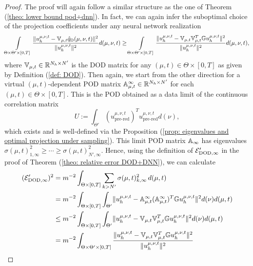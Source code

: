 \begin{proof}  
    The proof will again follow a similar structure as the one of Theorem (\ref{theo: lower bound pod+dnn}).
    In fact, we can again infer the suboptimal choice of the projection coefficients under any neural network
    realization
    \begin{equation*}
        \int\limits_{\Theta \times \Theta' \times [0, T]} 
        \frac{\lVert u_h^{\mu, \nu, t} - \mathbb{V}_{\mu, t} \hat{q}_\text{D}(\mu, \nu, t) \rVert^2}{\lVert u_h^{\mu, \nu, t} \rVert^2} d(\mu, \nu, t)
        \geq
        \int\limits_{\Theta \times \Theta' \times [0, T]} 
        \frac{\lVert u_h^{\mu, \nu, t} - \mathbb{V}_{\mu, t} \mathbb{V}_{\mu, t}^T \mathbb{G} u_h^{\mu, \nu, t} \rVert^2}{\lVert u_h^{\mu, \nu, t} \rVert^2} d(\mu, \nu, t),
    \end{equation*}
    where $\mathbb{V}_{\mu, t} \in \mathbb{R}^{N_h \times N'}$ is the DOD matrix  
    for any $(\mu, t) \in \Theta \times [0, T]$ as given by Definition (\ref{def: DOD}). Then again,
    we start from the other direction for a virtual $(\mu, t)$-dependent 
    POD matrix $\mathbb{A}^\infty_{\mu, t} \in \mathbb{R}^{N_h \times N'}$ for each
    $(\mu, t) \in \Theta \times [0, T]$. This is the POD obtained as a data limit of 
    the continuous correlation matrix
    \begin{equation*}
        U := \int_{\Theta'} \left(u_\text{pre-red}^{\mu, \nu, t}\right)^T u_\text{pre-red}^{\mu, \nu, t} d(\nu),
    \end{equation*}
    which exists and is well-defined via the Proposition 
    (\ref{prop: eigenvalues and optimal projection under sampling}). This limit POD matrix $\mathbb{A}_\infty$ has eigenvalues
    $\sigma(\mu, t)^2_{1, \infty} \geq \cdots \geq \sigma(\mu, t)^2_{N', \infty}$. Hence, using the 
    definition of $\mathcal{E}'_{\text{DOD}, \infty}$ in the proof of Theorem (\ref{theo: relative error DOD+DNN}), we can
    calculate
    \begin{align}
        (\Ecal'_{\text{DOD}, \infty})^2 &= m^{-2} 
        \int_{\Theta \times [0, T]} \sum_{k > N'} \sigma(\mu, t)_{k,\infty}^2 \, d(\mu, t) \\
        &= m^{-2}
        \int_{\Theta \times [0, T]} 
        \int_{\Theta'} \norm{\uht - \A^\infty_{\mu, t} (\A^\infty_{\mu, t})^T \G \uht}^2 d(\nu) d(\mu, t)
        \label{align: lower bound dod 1} \\
        &\leq m^{-2}
        \int_{\Theta \times [0, T]}
        \int_{\Theta'} \norm{\uht - \V_{\mu, t} \V_{\mu, t}^T \G \uht}^2 d(\nu) d(\mu, t)
        \label{align: lower bound dod 2} \\
        &= m^{-2} \int_{\Theta \times \Theta' \times [0, T]} \frac{\norm{\uht - \V_{\mu, t} \V_{\mu, t}^T \G \uht}^2}{\norm{\uht}^2}

\end{align}
\end{proof}
